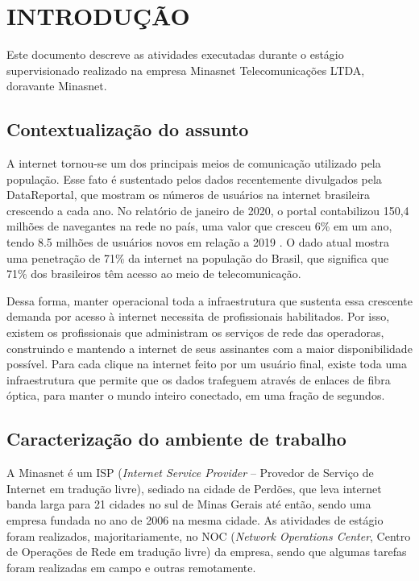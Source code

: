 \chapter{INTRODUÇÃO}

    Este documento descreve as atividades executadas durante o estágio supervisionado realizado na empresa Minasnet Telecomunicações LTDA, doravante Minasnet.

\section{Contextualização do assunto}

    A internet tornou-se um dos principais meios de comunicação utilizado pela população. Esse fato é sustentado pelos dados recentemente divulgados pela DataReportal, que mostram os números de usuários na internet brasileira crescendo a cada ano. No relatório de janeiro de 2020, o portal contabilizou 150,4 milhões de navegantes na rede no país, uma valor que cresceu 6\% em um ano, tendo 8.5 milhões de usuários novos em relação a 2019 \cite{datereportal2020}. O dado atual mostra uma penetração de 71\% da internet na população do Brasil, que significa que 71\% dos brasileiros têm acesso ao meio de telecomunicação.
    
    Dessa forma, manter operacional toda a infraestrutura que sustenta essa crescente demanda por acesso à internet necessita de profissionais habilitados. Por isso, existem os profissionais que administram os serviços de rede das operadoras, construindo e mantendo a internet de seus assinantes com a maior disponibilidade possível. Para cada clique na internet feito por um usuário final, existe toda uma infraestrutura que permite que os dados trafeguem através de enlaces de fibra óptica, para manter o mundo inteiro conectado, em uma fração de segundos.

\section{Caracterização do ambiente de trabalho}

    A Minasnet é um ISP (\textit{Internet Service Provider} -- Provedor de Serviço de Internet em tradução livre), sediado na cidade de Perdões, que leva internet banda larga para 21 cidades no sul de Minas Gerais até então, sendo uma empresa fundada no ano de 2006 na mesma cidade. As atividades de estágio foram realizados, majoritariamente, no NOC (\textit{Network Operations Center}, Centro de Operações de Rede em tradução livre) da empresa, sendo que algumas tarefas foram realizadas em campo e outras remotamente.


